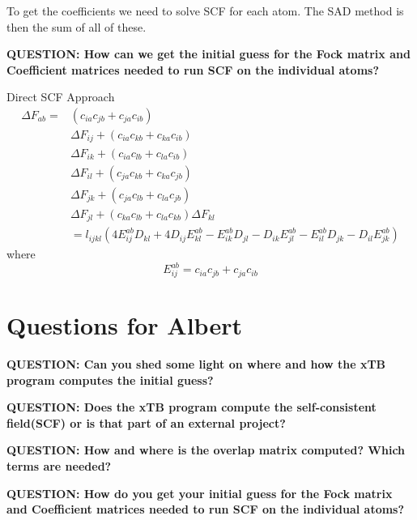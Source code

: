 \documentclass{article}
\newcommand{\q}[1]{\textbf{QUESTION: #1}}
\begin{document}
To get the coefficients we need to solve SCF for each atom.
The SAD method is then the sum of all of these.

\vspace{10pt}
\noindent
\q{How can we get the initial guess for the Fock matrix and Coefficient matrices needed to run SCF on the individual atoms?}

Direct SCF Approach
\begin{equation}
\begin{split}
  \Delta F_{ab} = &(c_{ia}c_{jb} + c_{ja}c_{ib})\\
  &\Delta F_{ij} + (c_{ia}c_{kb} + c_{ka}c_{ib})\\
  &\Delta F_{ik} + (c_{ia}c_{lb} + c_{la}c_{ib})\\
  &\Delta F_{il} + (c_{ja}c_{kb} + c_{ka}c_{jb})\\
  &\Delta F_{jk} + (c_{ja}c_{lb} + c_{la}c_{jb})\\
  &\Delta F_{jl} + (c_{ka}c_{lb} + c_{la}c_{kb}) \Delta F_{kl}\\
  &= l_{ijkl}(4E_{ij}^{ab}D_{kl} + 4D_{ij}E_{kl}^{ab} - E_{ik}^{ab}D_{jl} - D_{ik}E_{jl}^{ab} - E_{il}^{ab}D_{jk} - D_{il}E_{jk}^{ab})
\end{split}
\end{equation}
where
\begin{equation}
  E_{ij}^{ab} = c_{ia}c_{jb} + c_{ja}c_{ib}
\end{equation}



\section{Questions for Albert}

\q{Can you shed some light on where and how the xTB program computes the initial guess?}

\vspace{10pt}
\noindent
\q{Does the xTB program compute the self-consistent field(SCF) or is that part of an external project?}

\vspace{10pt}
\noindent
\q{How and where is the overlap matrix computed? Which terms are needed?}

\vspace{10pt}
\noindent
\q{How do you get your initial guess for the Fock matrix and Coefficient matrices needed to run SCF on the individual atoms?}
\end{document}
